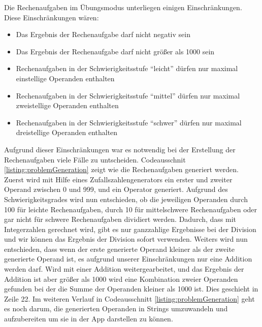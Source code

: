 Die Rechenaufgaben im Übungsmodus unterliegen einigen Einschränkungen. Diese Einschränkungen wären:
\begin{itemize}
\item Das Ergebnis der Rechenaufgabe darf nicht negativ sein
\item Das Ergebnis der Rechenaufgabe darf nicht größer als 1000 sein
\item Rechenaufgaben in der Schwierigkeitsstufe \enquote{leicht} dürfen nur maximal einstellige Operanden enthalten
\item Rechenaufgaben in der Schwierigkeitsstufe \enquote{mittel} dürfen nur maximal zweistellige Operanden enthalten
\item Rechenaufgaben in der Schwierigkeitsstufe \enquote{schwer} dürfen nur maximal dreistellige Operanden enthalten
\end{itemize}
Aufgrund dieser Einschränkungen war es notwendig bei der Erstellung der Rechenaufgaben viele 
Fälle zu untscheiden. Codeausschnit \ref{listing:problemGeneration} zeigt wie die Rechenaufgaben
generiert werden.
Zuerst wird mit Hilfe eines Zufallszahlengenerators ein erster und zweiter Operand zwischen 0 und 999, und ein Operator 
generiert. Aufgrund des Schwierigkeitsgrades wird nun entschieden, ob die jeweiligen Operanden durch
100 für leichte Rechenaufgaben, durch 10 für mittelschwere Rechenaufgaben oder gar nicht für schwere
Rechenaufgaben dividiert werden. Dadurch, dass mit Integerzahlen gerechnet wird, gibt es nur ganzzahlige
Ergebnisse bei der Division und wir können das Ergebnis der Division sofort verwenden.
Weiters wird nun entschieden, dass wenn der erste generierte Operand kleiner als der zweite generierte Operand 
ist, es aufgrund unserer Einschränkungen nur eine Addition werden darf. Wird mit einer 
Addition weitergearbeitet, und das Ergebnis der Addition ist aber größer als 1000 wird eine Kombination 
zweier Operanden gefunden bei der die Summe der Operanden kleiner als 1000 ist. Dies geschieht in Zeile 22.
Im weiteren Verlauf in Codeausschnitt \ref{listing:problemGeneration} geht es noch darum, die generierten
Operanden in Strings umzuwandeln und aufzubereiten um sie in der App darstellen zu können.


